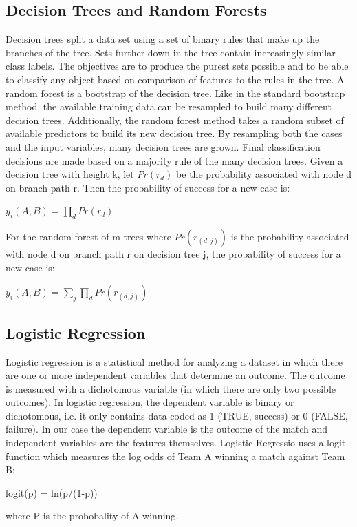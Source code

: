 \documentclass{article}
\begin{document}
\begin{multicols}{2}
	\subsection{Decision Trees and Random Forests}
	Decision trees split a data set using a set of binary rules that make up the branches of the tree. Sets further down in the tree contain increasingly similar class labels. The objectives are to produce the purest sets possible and to be able to classify any object based on comparison of features to the rules in the tree. A random forest is a bootstrap of the decision tree. Like in the standard bootstrap method, the available training data can be resampled to build many different decision trees. Additionally, the random forest method takes a random subset of available predictors to build its new decision tree. By resampling both the cases and the input
variables, many decision trees are grown. Final classification decisions are made based on a majority rule of the many decision trees. Given a decision tree with height k, let $Pr(r_d)$ be the probability associated with node d on branch path r. Then the probability of success for a new case is:
	\begin{center}
	$y_i(A,B)=\prod_{d} Pr(r_d)$
	\end{center}
For the random forest of m trees where $Pr(r_{(d, j)}
)$ is the probability associated with node
d on branch path r on decision tree j, the probability of success for a new case is:
	\begin{center}
	$y_i(A,B)=\sum_{j}\prod_{d} Pr(r_{(d,j)})$
	\end{center}
	
	\subsection{Logistic Regression}
	 Logistic regression is a statistical method for analyzing a dataset in which there are one or more independent variables that determine an outcome. The outcome is measured with a dichotomous variable (in which there are only two possible outcomes). In logistic regression, the dependent variable is binary or dichotomous, i.e. it only contains data coded as 1 (TRUE, success) or 0 (FALSE, failure). In our case the dependent variable is the outcome of the match and independent variables are the features themselves. Logistic Regressio uses a logit function which measures the log odds of Team A winning a match against Team B: 
	 \begin{center}
	 logit(p) = ln(p/(1-p)) 
	 \end{center}
	 where P is the probobality of A winning. 
	 

\end{multicols}
\end{document}
